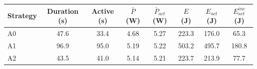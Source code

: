 \begin{tabular}{lccccccc}
\toprule
Strategy & Duration (s) & Active (s) & $\bar P$ (W) & $\bar P_{act}$ (W) & $E$ (J) & $E_{act}$ (J) & $E_{act}^{inc}$ (J) \\
\midrule
A0 & 47.6 & 33.4 & 4.68 & 5.27 & 223.3 & 176.0 & 65.3 \\
A1 & 96.9 & 95.0 & 5.19 & 5.22 & 503.2 & 495.7 & 180.8 \\
A2 & 43.5 & 41.0 & 5.14 & 5.21 & 223.7 & 213.9 & 77.7 \\
\bottomrule
\end{tabular}

